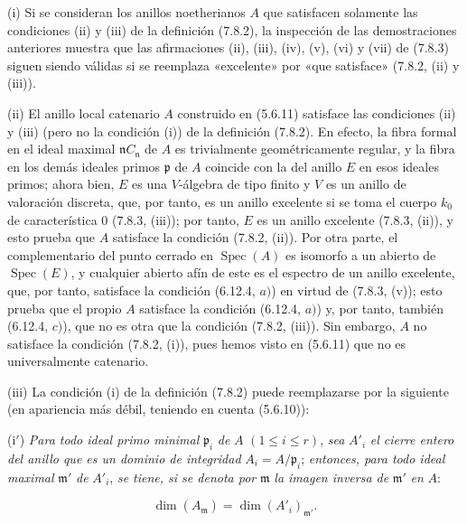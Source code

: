 \begin{remarks}[7.8.4]
\upshape
(i) Si se consideran los anillos noetherianos $A$ que satisfacen solamente
las condiciones (ii) y (iii) de la definición (7.8.2), la inspección de las
demostraciones anteriores muestra que las afirmaciones (ii), (iii), (iv),
(v), (vi) y (vii) de (7.8.3) siguen siendo válidas si se reemplaza «excelente»
por «que satisface» (7.8.2, (ii) y (iii)).

(ii) El anillo local catenario $A$ construido en (5.6.11) satisface las
condiciones (ii) y (iii) (pero no la condición (i)) de la definición (7.8.2).
En efecto, la fibra formal en el ideal maximal $\mathfrak n C_{\mathfrak n}$
de $A$ es trivialmente geométricamente regular, y la fibra en los demás
ideales primos $\mathfrak p$ de $A$ coincide con la del anillo $E$ en esos
ideales primos; ahora bien, $E$ es una $V$-álgebra de tipo finito y $V$ es
un anillo de valoración discreta, que, por tanto, es un anillo excelente
si se toma el cuerpo $k_0$ de característica $0$ (7.8.3, (iii)); por tanto,
$E$ es un anillo excelente (7.8.3, (ii)), y esto prueba que $A$ satisface
la condición (7.8.2, (ii)). Por otra parte, el complementario del punto
cerrado en $\operatorname{Spec}(A)$ es isomorfo a un abierto de
$\operatorname{Spec}(E)$, y cualquier abierto afín de este es el espectro
de un anillo
excelente, que, por tanto, satisface la condición (6.12.4, $a)$) en virtud
de (7.8.3, (v));
esto prueba que el propio $A$ satisface la condición (6.12.4, $a)$) y, por
tanto, también (6.12.4, $c)$), que no es otra que la condición (7.8.2, (iii)).
Sin embargo, $A$ no satisface la condición (7.8.2, (i)), pues hemos visto
en (5.6.11) que no es universalmente catenario.

(iii) La condición (i) de la definición (7.8.2) puede reemplazarse por la
siguiente (en apariencia más débil, teniendo en cuenta (5.6.10)):

(i$'$) \emph{Para todo ideal primo minimal} $\mathfrak p_i$ \emph{de} $A$
$(1\leq i\leq r)$, \emph{sea} $A'_i$ \emph{el cierre entero del anillo que
es un dominio de integridad} $A_i=A/\mathfrak p_i$; \emph{entonces, para
todo ideal maximal} $\mathfrak m'$ \emph{de} $A'_i$, \emph{se tiene, si
se denota por} $\mathfrak m$ \emph{la imagen inversa de} $\mathfrak m'$
\emph{en} $A$:
\begin{env}[7.8.4.1]
\label{IV.2.s7.8.4.1-fr}
\[
\dim(A_{\mathfrak m})=\dim(A'_i)_{\mathfrak m'}.
\]
\end{env}


\end{remarks}
